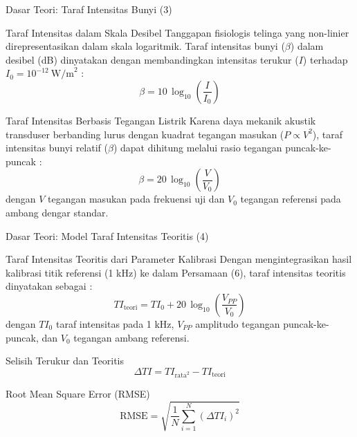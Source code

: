 \documentclass[aspectratio=169, 10pt]{beamer}
\begin{document}
	\begin{frame}{Dasar Teori: Taraf Intensitas Bunyi (3)}
		\begin{block}{Taraf Intensitas dalam Skala Desibel}
			Tanggapan fisiologis telinga yang non-linier direpresentasikan dalam skala logaritmik. Taraf intensitas bunyi ($\beta$) dalam desibel (dB) dinyatakan dengan membandingkan intensitas terukur ($I$) terhadap $I_0 = 10^{-12}\ \text{W/m}^2$ \parencite{halliday2021}:
			\begin{equation}
				\beta = 10\,\log_{10}\!\left(\frac{I}{I_0}\right)
			\end{equation}
		\end{block}

		\begin{block}{Taraf Intensitas Berbasis Tegangan Listrik}
			Karena daya mekanik akustik transduser berbanding lurus dengan kuadrat tegangan masukan ($P \propto V^2$), taraf intensitas bunyi relatif ($\beta$) dapat dihitung melalui rasio tegangan puncak-ke-puncak \parencite{ward2022}:
			\begin{equation}
				\beta = 20\,\log_{10}\!\left(\frac{V}{V_0}\right)
			\end{equation}
			dengan $V$ tegangan masukan pada frekuensi uji dan $V_0$ tegangan referensi pada ambang dengar standar.
		\end{block}
	\end{frame}

	\begin{frame}{Dasar Teori: Model Taraf Intensitas Teoritis (4)}
		\begin{block}{Taraf Intensitas Teoritis dari Parameter Kalibrasi}
			Dengan mengintegrasikan hasil kalibrasi titik referensi (1 kHz) ke dalam Persamaan (6), taraf intensitas teoritis dinyatakan sebagai \parencite{zhao2023}:
			\begin{equation}
				TI_{\text{teori}} = TI_0 + 20\,\log_{10}\!\left(\frac{V_{PP}}{V_0}\right)
			\end{equation}
			dengan $TI_0$ taraf intensitas pada 1 kHz, $V_{PP}$ amplitudo tegangan puncak-ke-puncak, dan $V_0$ tegangan ambang referensi.
		\end{block}

		\begin{block}{Selisih Terukur dan Teoritis}
			\begin{equation}
				\Delta TI = TI_{\text{rata}^2} - TI_{\text{teori}}
			\end{equation}
		\end{block}

		\begin{block}{Root Mean Square Error (RMSE)}
			\begin{equation}
				\text{RMSE} = \sqrt{\frac{1}{N}\sum_{i=1}^{N}(\Delta TI_i)^{2}}
			\end{equation}
		\end{block}
	\end{frame}
\end{document}
